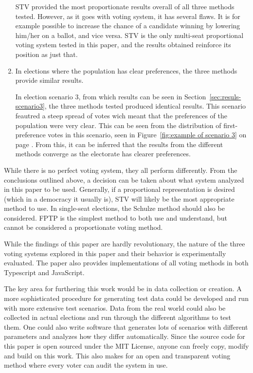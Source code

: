 \documentclass[12pt]{article}
\begin{document}
\begin{enumerate}
	STV provided the most proportionate results overall of all three methods tested. However, as it goes with voting system, it has several flaws. It is for example possible to increase the chance of a candidate winning by lowering him/her on a ballot, and vice versa. STV is the only multi-seat proportional voting system tested in this paper, and the results obtained reinforce its position as just that.
	\item In elections where the population has clear preferences, the three methods provide similar results.

	In election scenario 3, from which results can be seen in Section~\ref{sec:resuls-scenario3}, the three methods tested produced identical results. This scenario feautred a steep spread of votes wich meant that the preferences of the population were very clear. This can be seen from the distribution of first-preference votes in this scenario, seen in Figure~\ref{fig:example of scenario 3} on page \pageref{fig:example of scenario 3}. From this, it can be inferred that the results from the different methods converge as the electorate has clearer preferences.
\end{enumerate}
While there is no perfect voting system, they all perform differently. From the conclusions outlined above, a decision can be taken about what system analyzed in this paper to be used. Generally, if a proportional representation is desired (which in a democracy it usually is), STV will likely be the most appropriate method to use. In single-seat elections, the Schulze method should also be considered. FPTP is the simplest method to both use and understand, but cannot be considered a proportionate voting method.

While the findings of this paper are hardly revolutionary, the nature of the three voting systems explored in this paper and their behavior is experimentally evaluated. The paper also provides implementations of all voting methods in both Typescript and JavaScript.

The key area for furthering this work would be in data collection or creation. A more sophisticated procedure for generating test data could be developed and run with more extensive test scenarios. Data from the real world could also be collected in actual elections and run through the different algorithms to test them. One could also write software that generates lots of scenarios with different parameters and analyzes how they differ automatically. Since the source code for this paper is open sourced under the MIT License, anyone can freely copy, modify and build on this work. This also makes for an open and transparent voting method where every voter can audit the system in use.
\pagebreak
\end{document}
